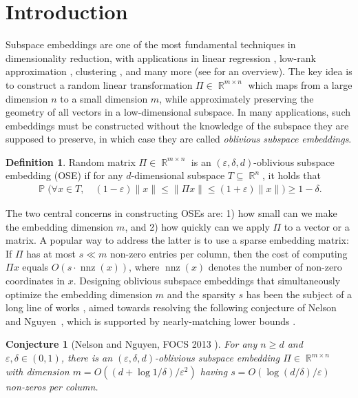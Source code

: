 \documentclass[11pt]{amsart}
\numberwithin{equation}{section}
\numberwithin{equation}{section}
\DeclareMathOperator{\R}{\mathbb{R}}
\DeclareMathOperator{\Pb}{\mathbb{P}}
\DeclareMathOperator{\nnz}{nnz}
\newtheorem{conjecture}[theorem]{Conjecture}
\theoremstyle{remark}
\theoremstyle{definition}
\newtheorem{definition}[theorem]{Definition}
\begin{document}
\section{Introduction}
Subspace embeddings are one of the most fundamental techniques in dimensionality reduction, with applications in linear regression \cite{sarlos2006improved}, low-rank approximation \cite{clarkson2013low}, clustering \cite{cohen2015dimensionality}, and many more (see \cite{woodruff2014sketching} for an overview). The key idea is to construct a random linear transformation $\Pi\in\R^{m\times n}$ which maps from a large dimension $n$ to a small dimension $m$, while approximately preserving the geometry of all vectors in a low-dimensional subspace. In many applications, such embeddings must be constructed without the knowledge of the subspace they are supposed to preserve, in which case they are called \emph{oblivious subspace embeddings}.
\begin{definition} \label{def:OSE}
    Random matrix $\Pi\in\R^{m\times n}$ is an $(\varepsilon,\delta,d)$-oblivious subspace embedding (OSE) if for any $d$-dimensional subspace $T\subseteq \R^n$, it holds that
    \begin{align*}
        \Pb\Big(\forall x\in T,\quad (1-\varepsilon)\|x\|\leq \|\Pi x\|\leq (1+\varepsilon)\|x\|\Big)\geq 1-\delta.
    \end{align*}
\end{definition}
The two central concerns in constructing OSEs are: 1) how small can we make the embedding dimension $m$, and 2) how quickly can we apply $\Pi$ to a vector or a matrix. A popular way to address the latter is to use a sparse embedding matrix: If $\Pi$ has at most $s\ll m$ non-zero entries per column, then the cost of computing $\Pi x$ equals $O(s\cdot \nnz(x))$, where $\nnz(x)$ denotes the number of non-zero coordinates in $x$. Designing oblivious subspace embeddings that simultaneously optimize the embedding dimension $m$ and the sparsity $s$ has been the subject of a long line of works \cite{clarkson2013low,meng2013low,nelson2013osnap,bourgain2015toward,cohen2016nearly,chenakkod2024optimal}, aimed towards resolving the following conjecture of Nelson and Nguyen~\cite{nelson2013osnap}, which is supported by nearly-matching lower bounds \cite{nelson2014lower,li2022lower}.
\begin{conjecture}[Nelson and Nguyen, FOCS 2013 \cite{nelson2013osnap}]\label{c:nn}
    For any $n\geq d$ and $\varepsilon,\delta\in(0,1)$, there is an $(\varepsilon,\delta,d)$-oblivious subspace embedding $\Pi\in\R^{m\times n}$ with dimension $m=O((d+\log1/\delta)/\varepsilon^2)$ having $s=O(\log(d/\delta)/\varepsilon)$ non-zeros per column.
\end{conjecture}
\end{document}
